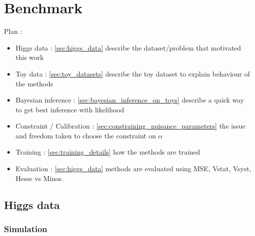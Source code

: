 
\chapter{Benchmark}
\label{chap:benchmark}
\ifpdf
    \graphicspath{{Chapter4/Figs/Raster/}{Chapter4/Figs/PDF/}{Chapter4/Figs/}}
\else
    \graphicspath{{Chapter4/Figs/Vector/}{Chapter4/Figs/}}
\fi


Plan :
\begin{itemize}
	\item Higgs data : \autoref{sec:higgs_data} describe the dataset/problem that motivated this work
	\item Toy data : \autoref{sec:toy_datasets} describe the toy dataset to explain behaviour of the methods
	\item Bayesian inference : \autoref{sec:bayesian_inference_on_toys} describe a quick way to get best inference with likelihood
	\item Constraint / Calibration : \autoref{sec:constraining_nuisance_parameters} the issue and freedom taken to choose the constraint on $\alpha$
	\item Training : \autoref{sec:training_details} how the methods are trained
	\item Evaluation : \autoref{sec:higgs_data} methods are evaluated using MSE, Vstat, Vsyst, Hesse vs Minos.
\end{itemize}






\section{Higgs data} %
\label{sec:higgs_data}





\subsection{Simulation} %
\label{sub:simulation}

